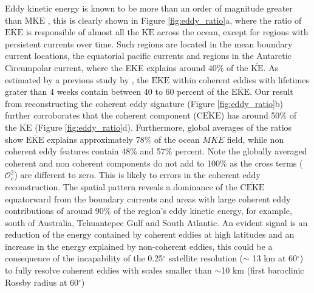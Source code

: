 \documentclass[draft,linenumbers]{agujournal2019}
\newcommand{\MKE}{\overline{\textrm{KE}}}
\newcommand{\mKE}{\textrm{MKE}}
\newcommand{\MEKE}{\overline{\textrm{EKE}}}
\newcommand{\EKE}{\textrm{EKE}}
\newcommand{\MCEKE}{\overline{\textrm{CEKE}}}
\begin{document}
	Eddy kinetic energy is known to be more than an order of magnitude greater than $\mKE$ \citep{Gill_Energy_1974}, this is clearly shown in Figure \ref{fig:eddy_ratio}a, where the ratio of $\MEKE$ is responsible of almost all the $\MKE$ across the ocean, except for regions with persistent currents over time. 
	Such regions are located in the mean boundary current locations, the equatorial pacific currents and regions in the Antarctic Circumpolar current, where the EKE explains around 40\% of the $\MKE$. 
	As estimated by a previous study by \citet{Chelton_The_2011}, the $\EKE$ within coherent eddies with lifetimes grater than 4 weeks contain between 40 to 60 percent of the $\MEKE$. 
	Our result from reconstructing the coherent eddy signature (Figure \ref{fig:eddy_ratio}b) further corroborates that the coherent component ($\MCEKE$) has around 50\% of the $\MKE$ (Figure \ref{fig:eddy_ratio}d). 
	Furthermore, global averages of the ratios show $\MEKE$ explains approximately 78\% of the ocean $MKE$ field, while non coherent eddy features contain 48\% and 57\% percent. 
	Note the globally averaged coherent and non coherent components do not add to 100\% as the cross terms ($\mathcal{O}_c^2$) are different to zero. 
	This is likely to errors in the coherent eddy reconstruction. 
	The spatial pattern reveals a dominance of the $\MCEKE$ equatorward from the boundary currents and areas with large coherent eddy contributions of around 90\% of the region's eddy kinetic energy, for example, south of Australia, Tehuantepec Gulf and South Atlantic. 
	An evident signal is an reduction of the energy contained by coherent eddies at high latitudes and an increase in the energy explained by non-coherent eddies, this could be a consequence of the incapability of the 0.25$^\circ$ satellite resolution ($\sim$ 13 km at 60$^\circ$) to fully resolve coherent eddies with scales smaller than $\sim$10 km (first baroclinic Rossby radius at 60$^\circ$)
\end{document}
